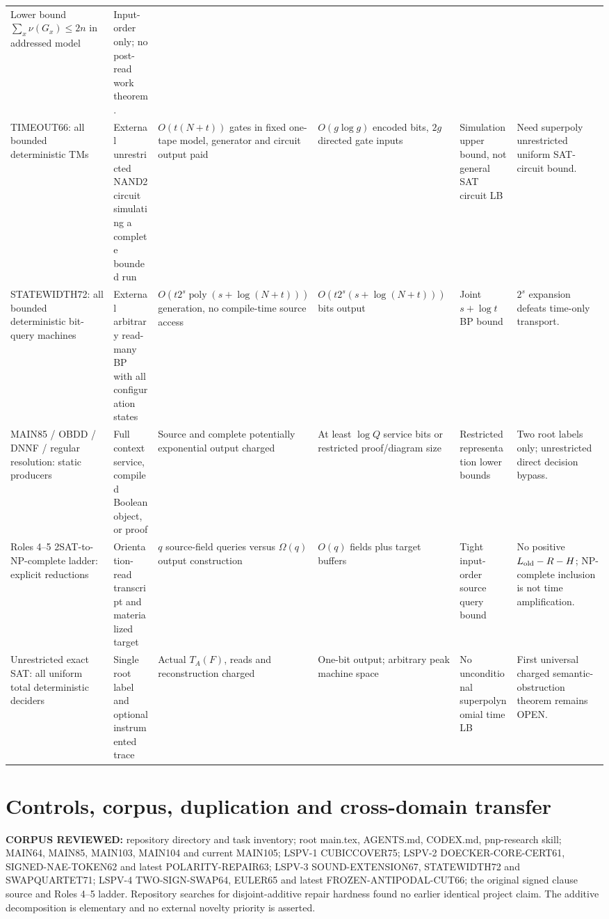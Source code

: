 \documentclass[11pt]{article}
\begin{document}
\begin{longtable}{@{}p{.14\linewidth}p{.14\linewidth}p{.175\linewidth}p{.155\linewidth}p{.17\linewidth}p{.14\linewidth}@{}}
Lower bound \(\sum_x\nu(G_x)\le2n\) in addressed model &
Input-order only; no post-read work theorem.\\
TIMEOUT66: all bounded deterministic TMs &
External unrestricted NAND2 circuit simulating a complete bounded run &
\(O(t(N+t))\) gates in fixed one-tape model, generator and circuit output paid &
\(O(g\log g)\) encoded bits, \(2g\) directed gate inputs &
Simulation upper bound, not general SAT circuit LB &
Need superpoly unrestricted uniform SAT-circuit bound.\\
STATEWIDTH72: all bounded deterministic bit-query machines &
External arbitrary read-many BP with all configuration states &
\(O(t2^s\operatorname{poly}(s+\log(N+t)))\) generation, no compile-time source access &
\(O(t2^s(s+\log(N+t)))\) bits output &
Joint \(s+\log t\) BP bound &
\(2^s\) expansion defeats time-only transport.\\
MAIN85 / OBDD / DNNF / regular resolution: static producers &
Full context service, compiled Boolean object, or proof &
Source and complete potentially exponential output charged &
At least \(\log Q\) service bits or restricted proof/diagram size &
Restricted representation lower bounds &
Two root labels only; unrestricted direct decision bypass.\\
Roles 4--5 2SAT-to-NP-complete ladder: explicit reductions &
Orientation-read transcript and materialized target &
\(q\) source-field queries versus \(\Omega(q)\) output construction &
\(O(q)\) fields plus target buffers &
Tight input-order source query bound &
No positive \(L_{\rm old}-R-H\); NP-complete inclusion is not time amplification.\\
Unrestricted exact SAT: all uniform total deterministic deciders &
Single root label and optional instrumented trace &
Actual \(T_A(F)\), reads and reconstruction charged &
One-bit output; arbitrary peak machine space &
No unconditional superpolynomial time LB &
First universal charged semantic-obstruction theorem remains OPEN.\\
\bottomrule
\end{longtable}\normalsize

\section{Controls, corpus, duplication and cross-domain transfer}
\textbf{CORPUS REVIEWED:} repository directory and task inventory; root main.tex, AGENTS.md, CODEX.md, pnp-research skill; MAIN64, MAIN85, MAIN103, MAIN104 and current MAIN105; LSPV-1 CUBICCOVER75; LSPV-2 DOECKER-CORE-CERT61, SIGNED-NAE-TOKEN62 and latest POLARITY-REPAIR63; LSPV-3 SOUND-EXTENSION67, STATEWIDTH72 and SWAPQUARTET71; LSPV-4 TWO-SIGN-SWAP64, EULER65 and latest FROZEN-ANTIPODAL-CUT66; the original signed clause source and Roles 4--5 ladder. Repository searches for disjoint-additive repair hardness found no earlier identical project claim. The additive decomposition is elementary and no external novelty priority is asserted.
\end{document}
